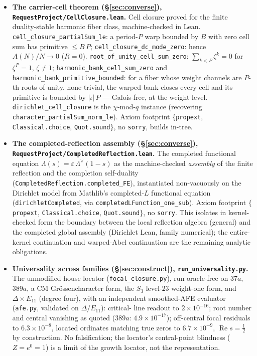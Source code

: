 \documentclass[11pt]{article}
\theoremstyle{definition}
\renewcommand{\Re}{\operatorname{Re}}
\begin{document}
\begin{itemize}
\item \textbf{The carrier-cell theorem (\S\ref{sec:converse}), \texttt{RequestProject/CellClosure.lean}.}
Cell closure proved for the finite duality-stable harmonic fiber class, machine-checked in Lean.
\texttt{cell\_closure\_partialSum\_le}: a period-$P$ warp bounded by $B$ with zero cell sum has primitive
$\le B\,P$; \texttt{cell\_closure\_dc\_mode\_zero}: hence $A(N)/N\to0$ ($R=0$). \texttt{root\_of\_unity\_cell\_sum\_zero}:
$\sum_{k<P}\zeta^k=0$ for $\zeta^P=1$, $\zeta\ne1$; \texttt{harmonic\_bank\_cell\_sum\_zero} and
\texttt{harmonic\_bank\_primitive\_bounded}: for a fiber whose weight channels are $P$-th roots of unity,
none trivial, the warped bank closes every cell and its primitive is bounded by $|\iota|\,P$ --- Galois-free,
at the weight level. \texttt{dirichlet\_cell\_closure} is the $\chi$-mod-$q$ instance (recovering
\texttt{character\_partialSum\_norm\_le}). Axiom footprint $\{$\texttt{propext}, \texttt{Classical.choice},
\texttt{Quot.sound}$\}$, no \texttt{sorry}, builds in-tree.

\item \textbf{The completed-reflection assembly (\S\ref{sec:converse}),
\texttt{RequestProject/CompletedReflection.lean}.} The completed functional equation
$\Lambda(s)=\varepsilon\,\Lambda^\vee(1-s)$ as the machine-checked \emph{assembly} of the finite reflection
and the completion self-duality (\texttt{CompletedReflection.completed\_FE}), instantiated non-vacuously on
the Dirichlet model from Mathlib's completed-$L$ functional equation (\texttt{dirichletCompleted}, via
\texttt{completedLFunction\_one\_sub}). Axiom footprint $\{$\texttt{propext}, \texttt{Classical.choice},
\texttt{Quot.sound}$\}$, no \texttt{sorry}. This isolates in kernel-checked form the boundary between the
local reflection algebra (general) and the completed global assembly (Dirichlet Lean, family numerical);
the entire-kernel continuation and warped-Abel continuation are the remaining analytic obligations.

\item \textbf{Universality across families (\S\ref{sec:construct}), \texttt{run\_universality.py}.}
The unmodified house locator (\texttt{focal\_closure.py}), run oracle-free on $37a$, $389a$, a CM
Gr\"ossencharacter form, the $S_3$ level-$23$ weight-one form, and $\Delta\times E_{11}$ (degree four),
with an independent smoothed-AFE evaluator (\texttt{afe.py}, validated on $\Delta$/$E_{11}$): critical-
line readout to $2\times10^{-16}$; root number and central vanishing as quoted
($389a$: $4.9\times10^{-17}$); off-central focal residuals to $6.3\times10^{-8}$, located ordinates
matching true zeros to $6.7\times10^{-9}$, $\Re s=\tfrac12$ by construction. No falsification; the
locator's central-point blindness ($Z=e^{0}=1$) is a limit of the growth locator, not the
representation.


\end{itemize}
\end{document}
